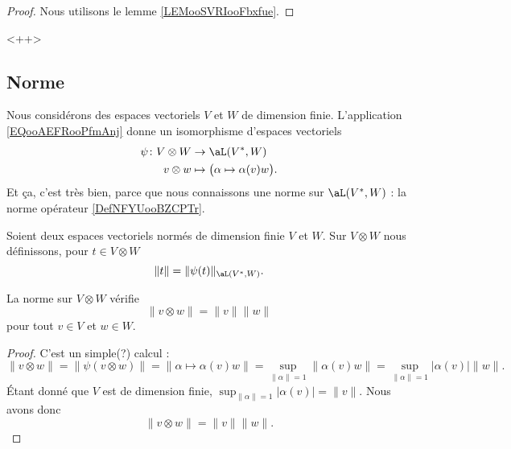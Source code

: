 \begin{proof}
	Nous utilisons le lemme \ref{LEMooSVRIooFbxfue}.
\end{proof}<++>

\subsection{Norme}

Nous considérons des espaces vectoriels \( V\) et \( W\) de dimension finie. L'application \eqref{EQooAEFRooPfmAnj} donne un isomorphisme d'espaces vectoriels
\begin{equation}
	\begin{aligned}
		\psi\colon V\otimes W & \to \aL(V^*,W)                                \\
		v\otimes w            & \mapsto \big( \alpha\mapsto \alpha(v)w \big).
	\end{aligned}
\end{equation}
Et ça, c'est très bien, parce que nous connaissons une norme sur \( \aL(V^*,W)\) :  la norme opérateur \ref{DefNFYUooBZCPTr}.

\begin{definition}      \label{DEFooEXXNooMgIpSV}
	Soient deux espaces vectoriels normés de dimension finie \( V\) et \( W\). Sur \( V\otimes W\) nous définissons, pour \( t\in V\otimes W\)
	\begin{equation}
		\| t \|=\| \psi(t) \|_{\aL(V^*,W)}.
	\end{equation}
\end{definition}

\begin{lemma}        \label{LEMooQPXHooJWfpmk}
	La norme sur \( V\otimes W\) vérifie
	\begin{equation}
		\| v\otimes w \|=\| v \|\| w \|
	\end{equation}
	pour tout \( v\in V\) et \( w\in W\).
\end{lemma}

\begin{proof}
	C'est un simple(?) calcul :
	\begin{equation}
		\| v\otimes w \|=\| \psi(v\otimes w) \|=\| \alpha\mapsto \alpha(v)w \|=\sup_{\| \alpha \|=1}\| \alpha(v)w \|=\sup_{\| \alpha \|=1}| \alpha(v) |\| w \|.
	\end{equation}
	Étant donné que \( V\) est de dimension finie, \( \sup_{\| \alpha \|=1}| \alpha(v) |=\| v \|\). Nous avons donc
	\begin{equation}
		\| v\otimes w \|=\| v \|\| w \|.
	\end{equation}
\end{proof}

